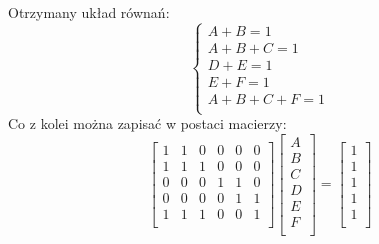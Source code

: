 \documentclass[letterpaper,12pt]{article}
\begin{document}
Otrzymany układ równań: \\
$$
\begin{cases}
 A + B = 1 \\
 A + B + C = 1 \\
 D + E = 1 \\
 E + F = 1 \\
 A + B + C + F = 1 \\
\end{cases}
$$
\newpage
Co z kolei można zapisać w postaci macierzy: \\
\[
\begin{bmatrix}
    1 & 1 & 0 & 0 & 0 & 0 \\
    1 & 1 & 1 & 0 & 0 & 0 \\
    0 & 0 & 0 & 1 & 1 & 0 \\
    0 & 0 & 0 & 0 & 1 & 1 \\
    1 & 1 & 1 & 0 & 0 & 1 \\
\end{bmatrix}
\begin{bmatrix}
    A \\ B \\ C \\ D \\ E \\ F\\
\end{bmatrix}
=
\begin{bmatrix}
    1 \\ 1 \\ 1 \\ 1 \\ 1 \\
\end{bmatrix}
\]
\end{document}
